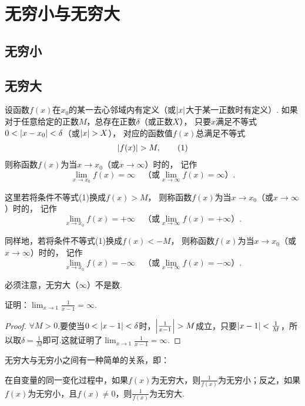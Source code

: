 \section{无穷小与无穷大}
\subsection{无穷小}

\subsection{无穷大}
\begin{definition}
设函数\(f(x)\)在\(x_0\)的某一去心邻域内有定义（或\(\abs{x}\)大于某一正数时有定义）.
如果对于任意给定的正数\(M\)，总存在正数\(\delta\)（或正数\(X\)），
只要\(x\)满足不等式\(0 < \abs{x - x_0} < \delta\)（或\(\abs{x} > X\)），
对应的函数值\(f(x)\)总满足不等式\begin{gather}
	\abs{f(x)} > M, \tag1
\end{gather}
则称函数\(f(x)\)为当\(x \to x_0\)（或\(x \to \infty\)）时的，
记作\[
	\lim_{x \to x_0}f(x) = \infty
	\quad\text{（或} \lim_{x \to \infty}f(x) = \infty \text{）}.
\]

这里若将条件不等式(1)换成\(f(x) > M\)，
则称函数\(f(x)\)为当\(x \to x_0\)（或\(x \to \infty\)）时的，
记作\[
	\lim_{x \to x_0}f(x) = +\infty
	\quad\text{（或} \lim_{x \to \infty}f(x) = +\infty \text{）}.
\]

同样地，若将条件不等式(1)换成\(f(x) < -M\)，
则称函数\(f(x)\)为当\(x \to x_0\)（或\(x \to \infty\)）时的，
记作\[
	\lim_{x \to x_0}f(x) = -\infty
	\quad\text{（或} \lim_{x \to \infty}f(x) = -\infty \text{）}.
\]
\end{definition}
必须注意，无穷大（\(\infty\)）不是数.

\begin{example}
证明：\(\lim_{x\to1}\frac{1}{x-1}=\infty\).
\begin{proof}
\(\forall M>0\).要使当\(0<\abs{x-1}<\delta\)时，\(\abs{\frac{1}{x-1}}>M\)成立，只要\(\abs{x-1}<\frac{1}{M}\)，所以取\(\delta=\frac{1}{M}\)即可.这就证明了\(\lim_{x\to1}\frac{1}{x-1}=\infty\).
\end{proof}
\end{example}

无穷大与无穷小之间有一种简单的关系，即：
\begin{theorem}\label{theorem:极限.无穷大与无穷小的关系}
在自变量的同一变化过程中，如果\(f(x)\)为无穷大，则\(\frac{1}{f(x)}\)为无穷小；反之，如果\(f(x)\)为无穷小，且\(f(x) \neq 0\)，则\(\frac{1}{f(x)}\)为无穷大.
\end{theorem}

